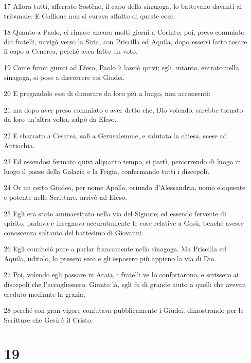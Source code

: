 \par 17 Allora tutti, afferrato Sostène, il capo della sinagoga, lo battevano davanti al tribunale. E Gallione non si curava affatto di queste cose.
\par 18 Quanto a Paolo, ei rimase ancora molti giorni a Corinto; poi, preso commiato dai fratelli, navigò verso la Siria, con Priscilla ed Aquila, dopo essersi fatto tosare il capo a Cencrea, perché avea fatto un voto.
\par 19 Come furon giunti ad Efeso, Paolo li lasciò quivi; egli, intanto, entrato nella sinagoga, si pose a discorrere coi Giudei.
\par 20 E pregandolo essi di dimorare da loro più a lungo, non acconsentì;
\par 21 ma dopo aver preso commiato e aver detto che, Dio volendo, sarebbe tornato da loro un'altra volta, salpò da Efeso.
\par 22 E sbarcato a Cesarea, salì a Gerusalemme, e salutata la chiesa, scese ad Antiochia.
\par 23 Ed essendosi fermato quivi alquanto tempo, si partì, percorrendo di luogo in luogo il paese della Galazia e la Frigia, confermando tutti i discepoli.
\par 24 Or un certo Giudeo, per nome Apollo, oriundo d'Alessandria, uomo eloquente e potente nelle Scritture, arrivò ad Efeso.
\par 25 Egli era stato ammaestrato nella via del Signore; ed essendo fervente di spirito, parlava e insegnava accuratamente le cose relative a Gesù, benché avesse conoscenza soltanto del battesimo di Giovanni.
\par 26 Egli cominciò pure a parlar francamente nella sinagoga. Ma Priscilla ed Aquila, uditolo, lo presero seco e gli esposero più appieno la via di Dio.
\par 27 Poi, volendo egli passare in Acaia, i fratelli ve lo confortarono, e scrissero ai discepoli che l'accogliessero. Giunto là, egli fu di grande aiuto a quelli che avevan creduto mediante la grazia;
\par 28 perché con gran vigore confutava pubblicamente i Giudei, dimostrando per le Scritture che Gesù è il Cristo.

\chapter{19}


